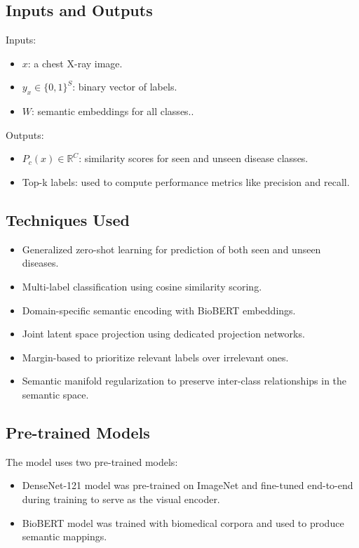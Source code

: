 \documentclass[letterpaper]{article} %
\begin{document}
\subsection{Inputs and Outputs}

Inputs:
\begin{itemize}
    \item $x$: a chest X-ray image.
    \item $y_x \in \{0, 1\}^S$: binary vector of labels.
    \item $W$: semantic embeddings for all classes..
\end{itemize}

Outputs:
\begin{itemize}
    \item $P_c(x) \in \mathbb{R}^C$: similarity scores for seen and unseen disease classes.
    \item Top-k labels: used to compute performance metrics like precision and recall.
\end{itemize}

\subsection{Techniques Used}

\begin{itemize}
    \item Generalized zero-shot learning for prediction of both seen and unseen diseases.
    \item Multi-label classification using cosine similarity scoring.
    \item Domain-specific semantic encoding with BioBERT embeddings.
    \item Joint latent space projection using dedicated projection networks.
    \item Margin-based to prioritize relevant labels over irrelevant ones.
    \item Semantic manifold regularization to preserve inter-class relationships in the semantic space.
\end{itemize}

\subsection{Pre-trained Models}

The model uses two pre-trained models:

\begin{itemize}
    \item DenseNet-121 model was pre-trained on ImageNet and fine-tuned end-to-end during training to serve as the visual encoder.
    \item BioBERT model was trained with biomedical corpora and used to produce semantic mappings.
\end{itemize}
\end{document}
